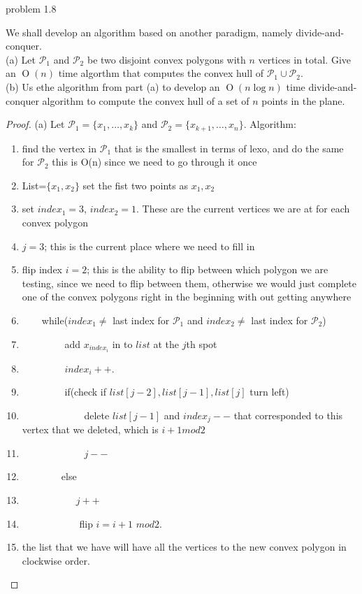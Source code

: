 \documentclass[12pt]{article}
\newcommand{\0}{\{0\}}
\newenvironment{proposition}[2][Proposition]{\begin{trivlist}
\item[\hspace \labelsep {\bfseries #1}\hspace \labelsep {\bfseries #2:}]}{\end{trivlist}}
\def\O{\operatorname{O}} %
\begin{document}
problem 1.8
	\begin{proposition}\\
		We shall develop an algorithm based on another paradigm, namely divide-and-conquer.
		\\
		(a) Let $\mathcal{P}_1$ and $\mathcal{P}_2$ be two disjoint convex polygons with $n$ vertices in total.  Give an $\O(n)$ time algorthm that computes  the convex hull of $\mathcal{P}_1\cup \mathcal{P}_2$.
		\\
		(b) Us ethe algorithm from part (a) to develop an $\O(n \log n)$ time divide-and-conquer algorithm to compute the convex hull of a set of $n$ points in the plane.
	\end{proposition}
	\begin{proof}
	\indent (a) Let $\mathcal{P}_1=\{x_1,\dots, x_k\}$ and $\mathcal{P}_2=\{x_{k+1},\dots, x_{n}\}$.
	Algorithm:
	\begin{enumerate}
	\item find the vertex in $\mathcal{P}_1$ that is the smallest in terms of lexo, and do the same for $\mathcal{P}_2$ this is O(n) since we need to go through it once
	\item List=$\{x_1,x_2\}$ set the fist two points as $x_1,x_2$
	\item set $index_1=3$, $index_2=1$.  These are the current vertices we are at for each convex polygon
	\item $j=3$;  this is the current place where we need to fill in
	\item flip index $i=2$; this is the ability to flip between which polygon we are testing, since we need to flip between them, otherwise we would just complete one of the convex polygons right in the beginning with out getting anywhere
	\item ~~~~while($index_1\neq$ last index for $\mathcal{P}_1$ and $index_2\neq$ last index for $\mathcal{P}_2$)
	\item ~~~~~~~~ add $x_{index_i}$ in to $list$ at the $j$th spot
	\item ~~~~~~~~ $index_i++$.
	\item ~~~~~~~~ if(check if $list[j-2],list[j-1], list[j]$ turn left)
	\item ~~~~~~~~~~~~ delete $list[j-1]$ and $index_j--$ that corresponded to this vertex that we deleted, which is $i+1 mod 2$
	\item ~~~~~~~~~~~~ $j--$
	\item ~~~~~~~~else 
	\item ~~~~~~~~~~~$ j++$
	\item ~~~~~~~~~~~ flip $i=i+1$ $mod 2$.
	\item the list that we have will have all the vertices to the new convex polygon in clockwise order.
	
	\end{enumerate}
	\end{proof}
\end{document}
